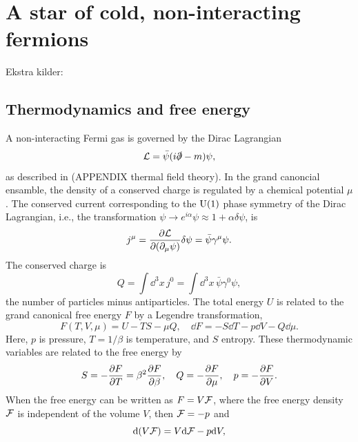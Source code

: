 \section{A star of cold, non-interacting fermions}
\label{section: cold fermi star}


Ekstra kilder: \autocite{andersenIntroductionStatisticalMechanics2012,glendenningCompactStarsNuclear2012}


\subsection{Thermodynamics and free energy}

A non-interacting Fermi gas is governed by the Dirac Lagrangian
%
\begin{equation}
    \mathcal{L} = \bar \psi (i \slashed \partial - m) \psi,
\end{equation}
%
as described in (APPENDIX thermal field theory).
In the grand canoncial ensamble, the density of a conserved charge is regulated by a chemical potential $\mu$.
The conserved current corresponding to the $\text U(1)$ phase symmetry of the Dirac Lagrangian, i.e., the transformation $\psi \rightarrow e^{i \alpha} \psi \approx 1 + \alpha \delta \psi$, is
%
\begin{equation}
    j^\mu = \diffp{\Ell}{(\partial_\mu \psi)} \delta \psi = \bar \psi \gamma^\mu \psi.
\end{equation}
%
The conserved charge is
%
\begin{equation}
    Q = \int \dd^3 x \, j^0 = \int \dd^3 x\, \bar \psi \gamma^0 \psi,
\end{equation}
%
the number of particles minus antiparticles.
The total energy $U$ is related to the grand canonical free energy $F$ by a Legendre transformation,
%
\begin{equation}
    F(T, V, \mu) = U - T S - \mu Q, \quad \dd F = - S \dd T - p \dd V - Q \dd \mu.
\end{equation}
%
Here, $p$ is pressure, $T = {1}/{\beta}$ is temperature, and $S$ entropy.
These thermodynamic variables are related to the free energy by
%
\begin{equation}
    S = - \diffp{F}{T} = \beta^2 \diffp{F}{\beta}, \quad
    Q = - \diffp{F}{\mu}, \quad
    p = - \diffp{F}{V}.
\end{equation}
%
When the free energy can be written as $F = V \mathcal{F}$, where the free energy density $\mathcal{F}$ is independent of the volume $V$, then $\mathcal{F} = - p$ and
%
\begin{equation}
    \text{d} (V \mathcal{F}) = V \text{d} \mathcal{F} - p \text{d} V,
\end{equation}
